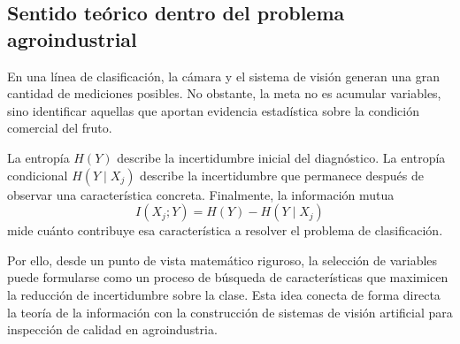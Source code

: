 \documentclass{article}
\begin{document}
\subsection{Sentido teórico dentro del problema agroindustrial}

En una línea de clasificación, la cámara y el sistema de visión generan una gran cantidad de mediciones posibles. No obstante, la meta no es acumular variables, sino identificar aquellas que aportan evidencia estadística sobre la condición comercial del fruto.

La entropía \(H(Y)\) describe la incertidumbre inicial del diagnóstico. La entropía condicional \(H(Y\mid X_j)\) describe la incertidumbre que permanece después de observar una característica concreta. Finalmente, la información mutua
\[
I(X_j;Y)=H(Y)-H(Y\mid X_j)
\]
mide cuánto contribuye esa característica a resolver el problema de clasificación.

Por ello, desde un punto de vista matemático riguroso, la selección de variables puede formularse como un proceso de búsqueda de características que maximicen la reducción de incertidumbre sobre la clase. Esta idea conecta de forma directa la teoría de la información con la construcción de sistemas de visión artificial para inspección de calidad en agroindustria.
\end{document}
